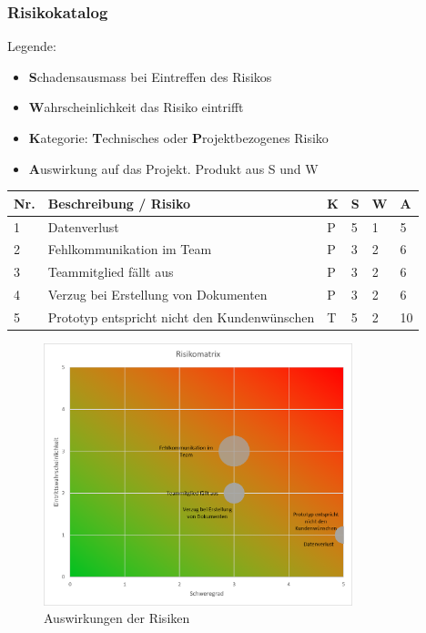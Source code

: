 \documentclass[a4paper]{scrreprt}
\begin{document}
\subsubsection{Risikokatalog}
\label{sssec:Risikokatalog}
Legende:
\begin{itemize}
	\item \textbf{S}chadensausmass bei Eintreffen des Risikos
	\item \textbf{W}ahrscheinlichkeit das Risiko eintrifft
	\item \textbf{K}ategorie: \textbf{T}echnisches oder \textbf{P}rojektbezogenes Risiko
	\item \textbf{A}uswirkung auf das Projekt. Produkt aus S und W
\end{itemize}

\vspace{1em}
\noindent
\begin{tabular}{|p{}|p{}|p{}|p{}|p{}||p{}|}
	\hline
	\textbf{Nr.} & \textbf{Beschreibung / Risiko} & \textbf{K} & \textbf{S} & \textbf{W} & \textbf{A} \\
	\hline
	1 & Datenverlust & P & 5 & 1 & 5\\
	\hline
	2 & Fehlkommunikation im Team & P & 3 & 2 & 6 \\
	\hline
	3 & Teammitglied fällt aus & P & 3 & 2 & 6 \\
	\hline
	4 & Verzug bei Erstellung von Dokumenten & P & 3 & 2 & 6 \\
	\hline
	5 & Prototyp entspricht nicht den Kundenwünschen & T & 5 & 2 & 10 \\
	\hline
\end{tabular}

\vspace{1em}

\begin{figure}[h!]
	\centering
	\includegraphics[keepaspectratio, width=0.8\textwidth]{Risikomatrix}
	\caption{Auswirkungen der Risiken}
\end{figure}
\end{document}
